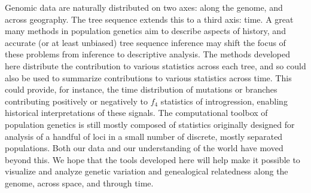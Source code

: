\documentclass{article}
\begin{document}

Genomic data are naturally distributed on two axes: along the genome, and across geography.
The tree sequence extends this to a third axis: time.
A great many methods in population genetics aim to describe aspects of history,
and accurate (or at least unbiased) tree sequence inference
may shift the focus of these problems from inference to descriptive analysis.
The methods developed here distribute the contribution to various statistics across each tree,
and so could also be used to summarize contributions to various statistics across time.
This could provide, for instance, the time distribution of mutations or branches
contributing positively or negatively to $f_4$ statistics of introgression,
enabling historical interpretations of these signals.
The computational toolbox of population genetics
is still mostly composed of statistics originally designed for analysis of a handful of loci
in a small number of discrete, mostly separated populations.
Both our data and our understanding of the world have moved beyond this.
We hope that the tools developed here will help make it possible
to visualize and analyze genetic variation and genealogical relatedness
along the genome, across space, and through time.

\end{document}

